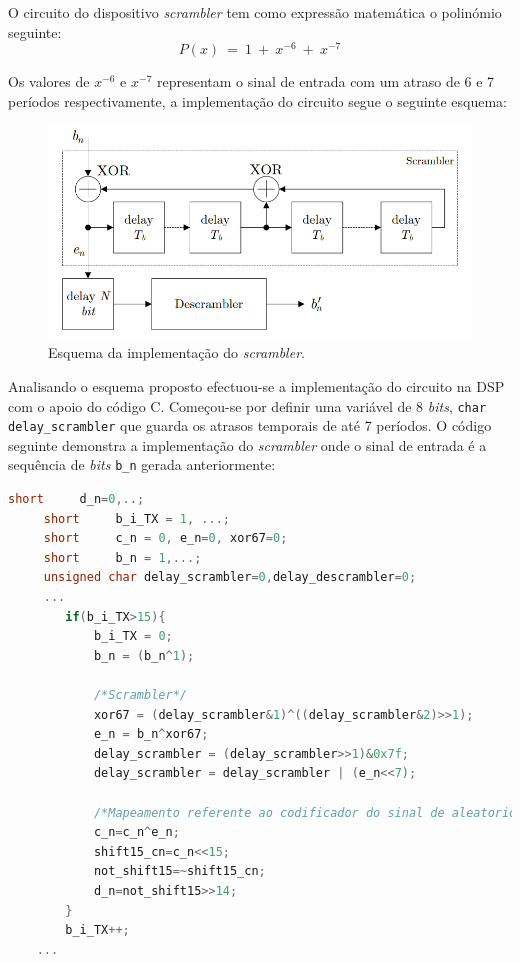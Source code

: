 \documentclass[11pt]{article}
\numberwithin{equation}{section}
\begin{document}
O circuito do dispositivo \textit{scrambler} tem como expressão matemática o polinómio seguinte:
\begin{equation}
	P(x)~= ~1~+~x^{-6}~+~x^{-7}
\end{equation}  

Os valores de $x^{-6}$ e $x^{-7}$ representam o sinal de entrada com um atraso de 6 e 7 períodos respectivamente, a implementação do circuito segue o seguinte esquema:

\begin{figure}[H]
	\centering
	\includegraphics[keepaspectratio=true, scale=0.50]{teoricas/scrambler}
	\caption{Esquema da implementação do \textit{scrambler}.}
	\vspace{-0.8em}
\end{figure}

Analisando o esquema proposto efectuou-se a implementação do circuito na DSP com o apoio do código C.
Começou-se por definir uma variável de 8 \textit{bits}, \texttt{char delay\_scrambler} que guarda os atrasos temporais de até 7 períodos. O código seguinte demonstra a implementação do \textit{scrambler} onde o sinal de entrada 	é a sequência de \textit{bits} \texttt{b\_n} gerada anteriormente:

\begin{lstlisting}[language=C]
	 short     d_n=0,..;
	 short     b_i_TX = 1, ...;
	 short     c_n = 0, e_n=0, xor67=0;
	 short     b_n = 1,...;
	 unsigned char delay_scrambler=0,delay_descrambler=0;
	 ...
		if(b_i_TX>15){
			b_i_TX = 0;
			b_n = (b_n^1);
			
			/*Scrambler*/
			xor67 = (delay_scrambler&1)^((delay_scrambler&2)>>1);
			e_n = b_n^xor67;
			delay_scrambler = (delay_scrambler>>1)&0x7f;
			delay_scrambler = delay_scrambler | (e_n<<7);
			
			/*Mapeamento referente ao codificador do sinal de aleatorio de saida do scrambler*/
			c_n=c_n^e_n;
			shift15_cn=c_n<<15;
			not_shift15=~shift15_cn;
			d_n=not_shift15>>14;
		}
		b_i_TX++;
	...
\end{lstlisting}
\end{document}
